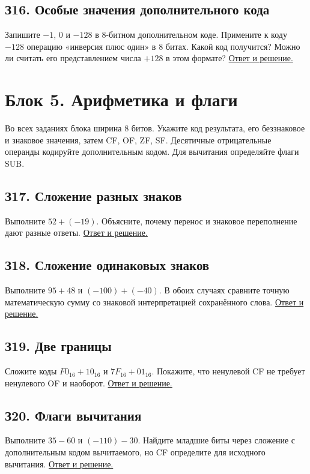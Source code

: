 \subsection*{З16. Особые значения дополнительного кода}\label{task:z16}
Запишите $-1$, 0 и $-128$ в 8-битном дополнительном коде. Примените к коду $-128$ операцию «инверсия плюс один» в 8 битах. Какой код получится? Можно ли считать его представлением числа $+128$ в этом формате?
\hyperref[ans:z16]{Ответ и решение.}

\section{Блок 5. Арифметика и флаги}
Во всех заданиях блока ширина 8 битов. Укажите код результата, его беззнаковое и знаковое значения, затем CF, OF, ZF, SF. Десятичные отрицательные операнды кодируйте дополнительным кодом. Для вычитания определяйте флаги SUB.

\subsection*{З17. Сложение разных знаков}\label{task:z17}
Выполните $52+(-19)$. Объясните, почему перенос и знаковое переполнение дают разные ответы.
\hyperref[ans:z17]{Ответ и решение.}

\subsection*{З18. Сложение одинаковых знаков}\label{task:z18}
Выполните $95+48$ и $(-100)+(-40)$. В обоих случаях сравните точную математическую сумму со знаковой интерпретацией сохранённого слова.
\hyperref[ans:z18]{Ответ и решение.}

\subsection*{З19. Две границы}\label{task:z19}
Сложите коды $F0_{16}+10_{16}$ и $7F_{16}+01_{16}$. Покажите, что ненулевой CF не требует ненулевого OF и наоборот.
\hyperref[ans:z19]{Ответ и решение.}

\subsection*{З20. Флаги вычитания}\label{task:z20}
Выполните $35-60$ и $(-110)-30$. Найдите младшие биты через сложение с дополнительным кодом вычитаемого, но CF определите для исходного вычитания.
\hyperref[ans:z20]{Ответ и решение.}

